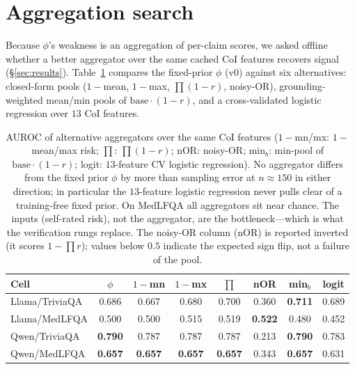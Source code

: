\documentclass[11pt]{article}
\begin{document}
\section{Aggregation search}\label{app:agg}
Because $\phi$'s weakness is an aggregation of per-claim scores, we asked offline whether a
better aggregator over the same cached CoI features recovers signal (\S\ref{sec:results}).
Table~\ref{tab:agg} compares the fixed-prior $\phi$ (v0) against six alternatives: closed-form
pools ($1{-}$mean, $1{-}$max, $\prod(1{-}r)$, noisy-OR), grounding-weighted mean/min pools of
$\mathrm{base}\cdot(1{-}r)$, and a cross-validated logistic regression over $13$ CoI features.
\begin{table}[t]
\centering\small
\setlength{\tabcolsep}{3.5pt}
\begin{tabular}{lccccccc}
\toprule
Cell & $\phi$ & $1{-}$mn & $1{-}$mx & $\prod$ & nOR & min$_b$ & logit \\
\midrule
Llama/TriviaQA & 0.686 & 0.667 & 0.680 & 0.700 & 0.360 & \textbf{0.711} & 0.689 \\
Llama/MedLFQA  & 0.500 & 0.500 & 0.515 & 0.519 & \textbf{0.522} & 0.480 & 0.452 \\
Qwen/TriviaQA  & \textbf{0.790} & 0.787 & 0.787 & 0.787 & 0.213 & \textbf{0.790} & 0.783 \\
Qwen/MedLFQA   & \textbf{0.657} & \textbf{0.657} & \textbf{0.657} & \textbf{0.657} & 0.343 & \textbf{0.657} & 0.631 \\
\bottomrule
\end{tabular}
\caption{AUROC of alternative aggregators over the same CoI features ($1{-}$mn/mx: $1{-}$mean/max
risk; $\prod$: $\prod(1{-}r)$; nOR: noisy-OR; min$_b$: min-pool of $\mathrm{base}\cdot(1{-}r)$;
logit: $13$-feature CV logistic regression). No aggregator differs from the fixed prior $\phi$
by more than sampling error at $n{\approx}150$ in either direction; in particular the
$13$-feature logistic regression never pulls clear of a training-free fixed prior. On MedLFQA
all aggregators sit near chance. The inputs (self-rated risk), not the aggregator, are the
bottleneck---which is what the verification rungs replace. The noisy-OR column (nOR) is
reported inverted (it scores $1{-}\prod r$); values below $0.5$ indicate the expected sign flip,
not a failure of the pool.}
\label{tab:agg}
\end{table}
\end{document}
